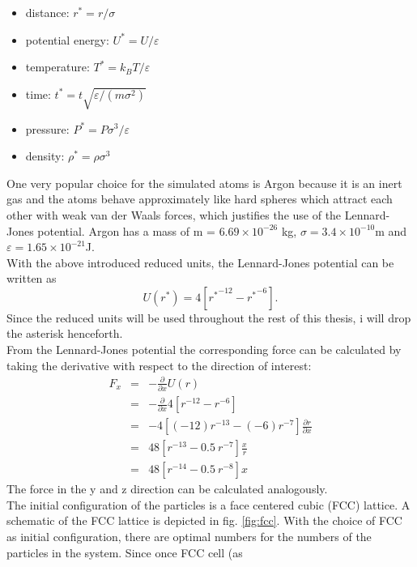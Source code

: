 \documentclass[12pt]{article}
\begin{document}
\begin{itemize}
    \item {distance:} $r^* = r/\sigma$
    \item {potential energy:} $U^* = U/\varepsilon$
    \item {temperature:} $T^* = k_B T/\varepsilon$
    \item {time:} $t^* = t\sqrt{\varepsilon/(m\sigma^2)}$
    \item {pressure:} $P^* = P\sigma^3/\varepsilon$
    \item {density:} $\rho^* = \rho \sigma^3$
\end{itemize}
One very popular choice for the simulated atoms is Argon because it is an inert gas and the atoms behave 
approximately like hard spheres which attract each other with weak van der Waals forces, which justifies the use of the Lennard-Jones potential. 
Argon has a mass of m = $6.69 \times 10^{-26}$ kg, $\sigma = 3.4 \times 10^{-10}$m and $\varepsilon = 1.65 \times 10^{-21}$J.\\
With the above introduced reduced units, the Lennard-Jones potential can be written as
\begin{equation}
    U(r^*) = 4\left[{r^*}^{-12} - {r^*}^{-6}\right].
\end{equation}
Since the reduced units will be used throughout the rest of this thesis, i will drop the asterisk henceforth.\\
From the Lennard-Jones potential the corresponding force can be calculated by taking the derivative with respect to the direction of interest:
\begin{eqnarray}
    F_{x} &=& -\frac{\partial}{\partial x} U(r) \nonumber\\
                &=& -\frac{\partial}{\partial x} 4\left[{r}^{-12} - {r}^{-6}\right] \nonumber\\
                &=& -4 \left[(-12){r}^{-13} - (-6){r}^{-7}\right] \frac{\partial r}{\partial x} \nonumber\\
                &=& 48 \left[r^{-13} - 0.5 \ r^{-7}\right] \frac{x}{r} \nonumber\\
    \label{eq:ljforce} &=& 48 \left[r^{-14} - 0.5 \ r^{-8}\right] x
\end{eqnarray}
The force in the y and z direction can be calculated analogously.\\
The initial configuration of the particles is a face centered cubic (FCC) lattice. A schematic of the FCC lattice is depicted in fig. \ref{fig:fcc}.
With the choice of FCC as initial configuration, there are optimal numbers for the numbers of the particles in the system. Since once FCC cell (as
\end{document}
